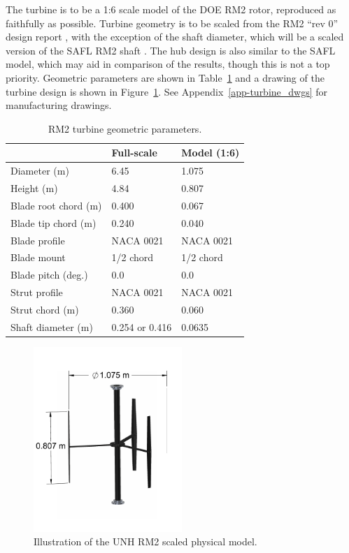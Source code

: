 \documentclass[14pt,letterpaper]{scrreprt}
\begin{document}
The turbine is to be a 1:6 scale model of the DOE RM2 rotor, reproduced as
faithfully as possible. Turbine geometry is to be scaled from the RM2 ``rev 0''
design report \cite{Barone2011}, with the exception of the shaft diameter, which
will be a scaled version of the SAFL RM2 shaft \cite{Hill2014}. The hub design
is also similar to the SAFL model, which may aid in comparison of the results,
though this is not a top priority. Geometric parameters are shown in
Table~\ref{tab-turb_geom} and a drawing of the turbine design is shown in
Figure~\ref{fig-turbine_drawing}. See Appendix~\ref{app-turbine_dwgs} for
manufacturing drawings.

\begin{table}[ht]
\centering
\begin{tabular}{l|l|l}
   & Full-scale & Model (1:6) \\
\hline 
Diameter (m)   & 6.45 & 1.075 \\ 
Height (m)     & 4.84 & 0.807 \\ 
Blade root chord (m) & 0.400 & 0.067 \\ 
Blade tip chord (m)  & 0.240 & 0.040 \\ 
Blade profile & NACA 0021 & NACA 0021 \\ 
Blade mount & 1/2 chord & 1/2 chord \\ 
Blade pitch (deg.) & 0.0 & 0.0 \\ 
Strut profile & NACA 0021 & NACA 0021 \\ 
Strut chord (m) & 0.360 & 0.060 \\ 
Shaft diameter (m) & 0.254 \cite{Beam2011} or 0.416 \cite{Hill2014} & 0.0635\\ 
\end{tabular}
\caption{RM2 turbine geometric parameters.}
\label{tab-turb_geom}
\end{table}

\begin{figure}[ht]
\centering
\includegraphics[width=0.5\textwidth]{Figures/turbine}
\caption{Illustration of the UNH RM2 scaled physical model.}
\label{fig-turbine_drawing}
\end{figure}
\end{document}
